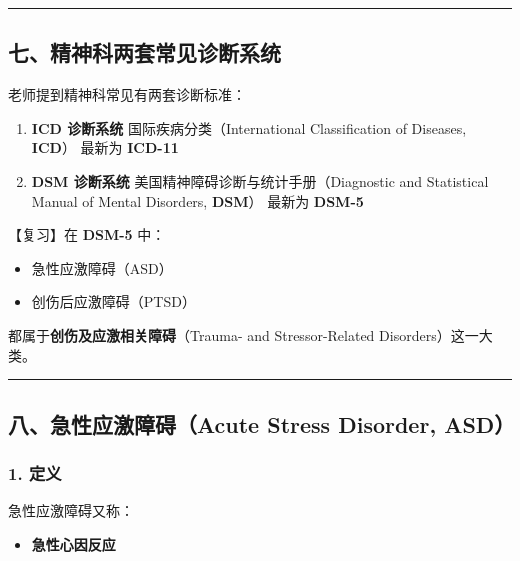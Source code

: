\documentclass[
  chinese,
  9pt,
  a4paper,
]{ctexart}
\providecommand{\tightlist}{%
  \setlength{\itemsep}{0pt}\setlength{\parskip}{0pt}}
\begin{document}
\begin{center}\rule{0.5\linewidth}{0.5pt}\end{center}

\subsection{七、精神科两套常见诊断系统}\label{ux4e03ux7cbeux795eux79d1ux4e24ux5957ux5e38ux89c1ux8bcaux65adux7cfbux7edf}

老师提到精神科常见有两套诊断标准：

\begin{enumerate}
\def\labelenumi{\arabic{enumi}.}
\item
  \textbf{ICD 诊断系统} 国际疾病分类（International Classification of
  Diseases, \textbf{ICD}） 最新为 \textbf{ICD-11}
\item
  \textbf{DSM 诊断系统} 美国精神障碍诊断与统计手册（Diagnostic and
  Statistical Manual of Mental Disorders, \textbf{DSM}） 最新为
  \textbf{DSM-5}
\end{enumerate}

【复习】在 \textbf{DSM-5} 中：

\begin{itemize}
\tightlist
\item
  急性应激障碍（ASD）
\item
  创伤后应激障碍（PTSD）
\end{itemize}

都属于\textbf{创伤及应激相关障碍}（Trauma- and Stressor-Related
Disorders）这一大类。

\begin{center}\rule{0.5\linewidth}{0.5pt}\end{center}

\subsection{八、急性应激障碍（Acute Stress Disorder,
ASD）}\label{ux516bux6025ux6027ux5e94ux6fc0ux969cux788dacute-stress-disorder-asd}

\subsubsection{1. 定义}\label{ux5b9aux4e49}

急性应激障碍又称：

\begin{itemize}
\tightlist
\item
  \textbf{急性心因反应}
\end{itemize}
\end{document}
